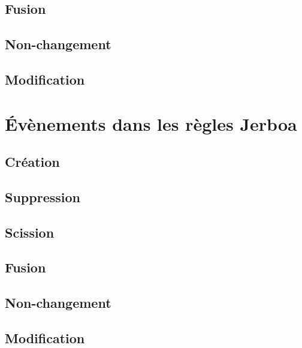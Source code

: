 \subsection[Fusion]{Fusion}
\label{sec:regle-base-Fusion}



\subsection[Non-changement]{Non-changement}
\label{sec:regle-base-non-changement}



\subsection[Modification]{Modification}
\label{sec:regle-base-modification}



\section[Évènements dans les règles Jerboa]{Évènements dans les règles Jerboa}
\label{sec:evenements-regles-jerboa}



\subsection[Création]{Création}
\label{sec:jerboa-creation}



\subsection[Suppression]{Suppression}
\label{sec:jerboa-suppression}



\subsection[Scission]{Scission}
\label{sec:jerboa-scission}



\subsection[Fusion]{Fusion}
\label{sec:jerboa-Fusion}



\subsection[Non-changement]{Non-changement}
\label{sec:jerboa-non-changement}

\subsection[Modification]{Modification}
\label{sec:jerboa-modification}



